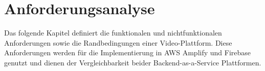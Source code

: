 \chapter{Anforderungsanalyse}

Das folgende Kapitel definiert die funktionalen und nichtfunktionalen Anforderungen sowie die Randbedingungen einer Video-Plattform. Diese Anforderungen werden für die Implementierung in AWS Amplify und Firebase genutzt und dienen der Vergleichbarkeit beider Backend-as-a-Service Plattformen.
